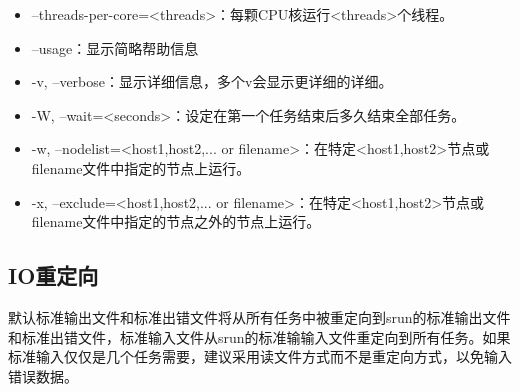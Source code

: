 \begin{itemize}
\item --threads-per-core=<threads>：每颗CPU核运行<threads>个线程。
\item --usage：显示简略帮助信息
\item -v, --verbose：显示详细信息，多个v会显示更详细的详细。
\item -W, --wait=<seconds>：设定在第一个任务结束后多久结束全部任务。
\item -w, --nodelist=<host1,host2,... or filename>：在特定<host1,host2>节点或filename文件中指定的节点上运行。
\item -x, --exclude=<host1,host2,... or filename>：在特定<host1,host2>节点或filename文件中指定的节点之外的节点上运行。
\end{itemize}

\subsection{IO重定向}
默认标准输出文件和标准出错文件将从所有任务中被重定向到srun的标准输出文件和标准出错文件，标准输入文件从srun的标准输输入文件重定向到所有任务。如果标准输入仅仅是几个任务需要，建议采用读文件方式而不是重定向方式，以免输入错误数据。


